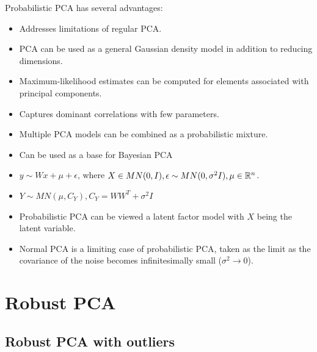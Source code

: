 \begin{refsection}
\begin{remark}[motivations]
Probabilistic PCA has several advantages:
\begin{itemize}
	\item Addresses limitations of regular PCA.
	\item PCA can be used as a general Gaussian density model
	in addition to reducing dimensions.
	\item Maximum-likelihood estimates can be computed for
	elements associated with principal components.
	\item Captures dominant correlations with few parameters.
	\item Multiple PCA models can be combined as a probabilistic mixture.
	\item Can be used as a base for Bayesian PCA
\end{itemize}	
\end{remark}

\begin{definition}
	

\begin{itemize}
	\item $y \sim Wx + \mu + \epsilon$, where $X\in MN(0, I), \epsilon\sim MN(0, \sigma^2 I), \mu\in \mathbb{R}^n$.
	\item $Y \sim MN(\mu, C_Y), C_Y = WW^T + \sigma^2 I$
\end{itemize}	
	
	
\end{definition}

\begin{remark}[interpretation]\hfill
\begin{itemize}
	\item Probabilistic PCA can be viewed a latent factor model with $X$ being the latent variable. 
	\item Normal PCA is a limiting case of probabilistic PCA, taken as
	the limit as the covariance of the noise becomes infinitesimally
	small ($\sigma^2 \to 0$). 
\end{itemize}	
	
\end{remark}

\begin{theorem}
	
\end{theorem}


\section{Robust PCA}
\subsection{Robust PCA with outliers}

\end{refsection}
